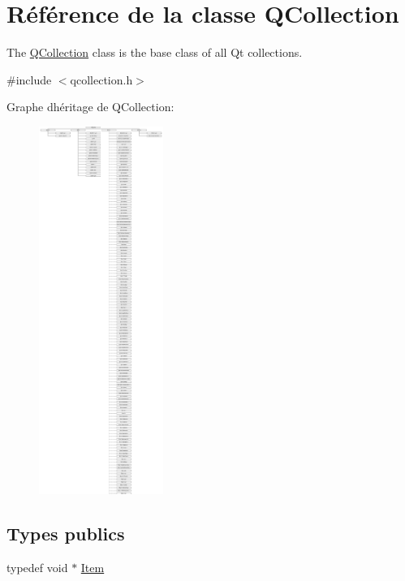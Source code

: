 \hypertarget{class_q_collection}{}\section{Référence de la classe Q\+Collection}
\label{class_q_collection}


The \hyperlink{class_q_collection}{Q\+Collection} class is the base class of all Qt collections.  




{\ttfamily \#include $<$qcollection.\+h$>$}

Graphe d\textquotesingle{}héritage de Q\+Collection\+:\begin{figure}[H]
\begin{center}
\leavevmode
\includegraphics[height=12.000000cm]{class_q_collection}
\end{center}
\end{figure}
\subsection*{Types publics}
\begin{DoxyCompactItemize}
\item 
typedef void $\ast$ \hyperlink{class_q_collection_ac6f3ddbf999e31fb797927f71ae6b5d7}{Item}
\end{DoxyCompactItemize}
